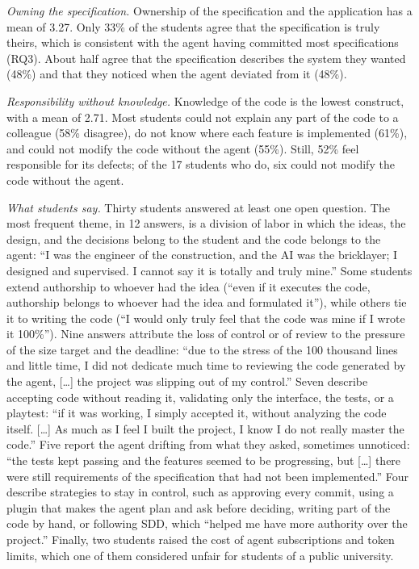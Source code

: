 \documentclass[conference]{IEEEtran}
\begin{document}
\emph{Owning the specification.} Ownership of the specification and the application has a mean of 3.27. Only 33\% of the students agree that the specification is truly theirs, which is consistent with the agent having committed most specifications (RQ3). About half agree that the specification describes the system they wanted (48\%) and that they noticed when the agent deviated from it (48\%).

\emph{Responsibility without knowledge.} Knowledge of the code is the lowest construct, with a mean of 2.71. Most students could not explain any part of the code to a colleague (58\% disagree), do not know where each feature is implemented (61\%), and could not modify the code without the agent (55\%). Still, 52\% feel responsible for its defects; of the 17 students who do, six could not modify the code without the agent.

\emph{What students say.} Thirty students answered at least one open question. The most frequent theme, in 12 answers, is a division of labor in which the ideas, the design, and the decisions belong to the student and the code belongs to the agent: ``I was the engineer of the construction, and the AI was the bricklayer; I designed and supervised. I cannot say it is totally and truly mine.'' Some students extend authorship to whoever had the idea (``even if it executes the code, authorship belongs to whoever had the idea and formulated it''), while others tie it to writing the code (``I would only truly feel that the code was mine if I wrote it 100\%''). Nine answers attribute the loss of control or of review to the pressure of the size target and the deadline: ``due to the stress of the 100 thousand lines and little time, I did not dedicate much time to reviewing the code generated by the agent, [\ldots] the project was slipping out of my control.'' Seven describe accepting code without reading it, validating only the interface, the tests, or a playtest: ``if it was working, I simply accepted it, without analyzing the code itself. [\ldots] As much as I feel I built the project, I know I do not really master the code.'' Five report the agent drifting from what they asked, sometimes unnoticed: ``the tests kept passing and the features seemed to be progressing, but [\ldots] there were still requirements of the specification that had not been implemented.'' Four describe strategies to stay in control, such as approving every commit, using a plugin that makes the agent plan and ask before deciding, writing part of the code by hand, or following SDD, which ``helped me have more authority over the project.'' Finally, two students raised the cost of agent subscriptions and token limits, which one of them considered unfair for students of a public university.
\end{document}
